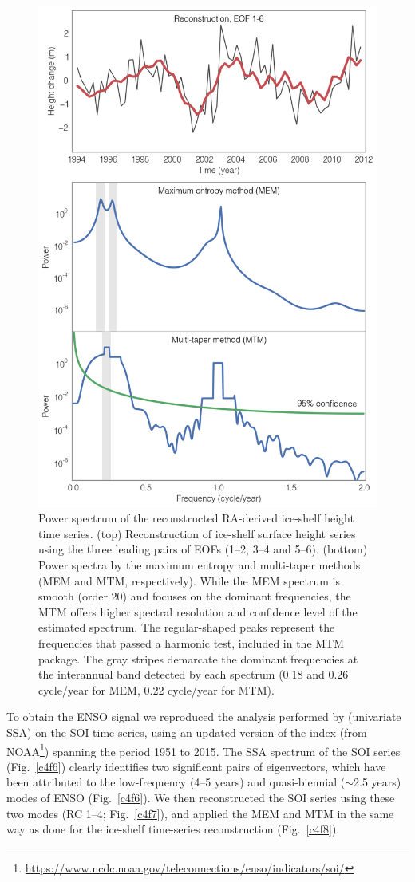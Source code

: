 \begin{figure}[!ht]
  \centering
  \includegraphics[width=.72\textwidth]{img/mem_mtm_amu_v2.png}
  \caption[Power spectrum of the reconstructed RA-derived ice-shelf]{
  \ssp \footnotesize
  Power spectrum of the reconstructed RA-derived ice-shelf height time series. (top) Reconstruction of ice-shelf surface height series using the three leading pairs of EOFs (1--2, 3--4 and 5--6). (bottom) Power spectra by the maximum entropy and multi-taper methods (MEM and MTM, respectively). While the MEM spectrum is smooth (order 20) and focuses on the dominant frequencies, the MTM offers higher spectral resolution and confidence level of the estimated spectrum. The regular-shaped peaks represent the frequencies that passed a harmonic test, included in the MTM package. The gray stripes demarcate the dominant frequencies at the interannual band detected by each spectrum (0.18 and 0.26 cycle/year for MEM, 0.22 cycle/year for MTM).
  }
  \label{c4f5}
\end{figure}


To obtain the ENSO signal we reproduced the analysis performed by \textcite{Ghil2002} (univariate SSA) on the SOI time series, using an updated version of the index (from NOAA\footnote{\url{https://www.ncdc.noaa.gov/teleconnections/enso/indicators/soi/}}) spanning the period 1951 to 2015. The SSA spectrum of the SOI series (Fig.~\ref{c4f6}) clearly identifies two significant pairs of eigenvectors, which have been attributed to the low-frequency (4--5 years) and quasi-biennial ($\sim$2.5 years) modes of ENSO \parencite[e.g.,][]{Ghil2002, Philander1989} (Fig.~\ref{c4f6}). We then reconstructed the SOI series using these two modes (RC 1--4; Fig.~\ref{c4f7}), and applied the MEM and MTM in the same way as done for the ice-shelf time-series reconstruction (Fig.~\ref{c4f8}). 



